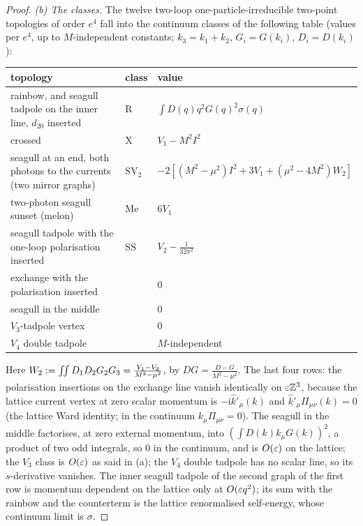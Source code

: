 \begin{proof}
\emph{(b) The classes.} The twelve two-loop one-particle-irreducible two-point topologies of order $e^4$ fall into the continuum classes of the following table (values per $e^4$, up to $M$-independent constants; $k_3=k_1+k_2$, $G_i=G(k_i)$, $D_i=D(k_i)$):
\begin{center}
\begin{tabular}{@{}lll@{}}
topology & class & value\\\hline
rainbow, and seagull tadpole on the inner line, $d_{20}$ inserted & $\mathrm R$ & $\int D(q)q^2G(q)^2\sigma(q)$\\
crossed & $\mathrm X$ & $V_1-M^2I^2$\\
seagull at an end, both photons to the currents (two mirror graphs) & $\mathrm{SV}_2$ & $-2[(M^2-\mu^2)I^2+3V_1+(\mu^2-4M^2)W_2]$\\
two-photon seagull sunset (melon) & $\mathrm{Me}$ & $6V_1$\\
seagull tadpole with the one-loop polarisation inserted & $\mathrm{SS}$ & $V_2-\frac1{32\pi^2}$\\
exchange with the polarisation inserted & & $0$\\
seagull in the middle & & $0$\\
$V_3$-tadpole vertex & & $0$\\
$V_4$ double tadpole & & $M$-independent
\end{tabular}
\end{center}
Here $W_2:=\int\!\!\int D_1D_2G_2G_3=\frac{V_1-V_2}{M^2-\mu^2}$, by $DG=\frac{D-G}{M^2-\mu^2}$. The last four rows: the polarisation insertions on the exchange line vanish identically on $\varepsilon\mathbb Z^3$, because the lattice current vertex at zero scalar momentum is $-\mathrm i\hat k'_\mu(k)$ and $\hat k'_\mu\Pi_{\mu\nu}(k)=0$ (the lattice Ward identity; in the continuum $k_\mu\Pi_{\mu\nu}=0$). The seagull in the middle factorises, at zero external momentum, into $(\int D(k)k_\mu G(k))^2$, a product of two odd integrals, so $0$ in the continuum, and is $O(\varepsilon)$ on the lattice; the $V_3$ class is $O(\varepsilon)$ as said in (a); the $V_4$ double tadpole has no scalar line, so its $s$-derivative vanishes. The inner seagull tadpole of the second graph of the first row is momentum dependent on the lattice only at $O(\varepsilon q^2)$; its sum with the rainbow and the counterterm is the lattice renormalised self-energy, whose continuum limit is $\sigma$.


\end{proof}
